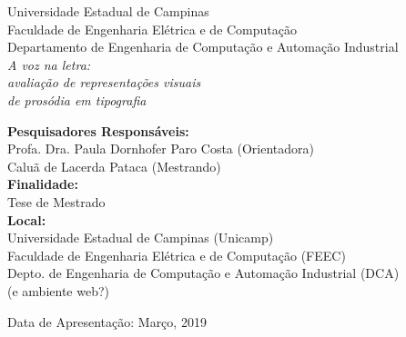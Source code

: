 \documentclass[a4paper,11pt,titlepage,singlespacing]{article}
\begin{document}
\begin{titlepage}
	\begin{center}
		\large{Universidade Estadual de Campinas}\\
		\large{Faculdade de Engenharia Elétrica e de Computação}\\ 
		\large{Departamento de Engenharia de Computação e Automação Industrial}\\ 
        \vspace{115pt}
        \huge\textit{A voz na letra: \\ avaliação de representações visuais \\ de prosódia em tipografia}\\
        
	\end{center}
	\vspace{95pt}
	\begin{flushleft}
        \large{\textbf{Pesquisadores Responsáveis:}}\\
        Profa. Dra. Paula Dornhofer Paro Costa (Orientadora)\\	
        Caluã de Lacerda Pataca (Mestrando)\\
        
        
        \vspace{15pt}
        \large{\textbf{Finalidade:} \\Tese de Mestrado}\\
        \vspace{15pt}
        \large{\textbf{Local:} \\
        Universidade Estadual de Campinas (Unicamp)
        \\Faculdade de Engenharia Elétrica e de Computação (FEEC)}\\
        Depto. de Engenharia de Computação e Automação Industrial (DCA)\\
        (e ambiente web?)
        \vspace{15pt}        
	\end{flushleft}
	\vspace{3,5cm}
	\begin{center}
	 Data de Apresentação: Março, 2019
	\end{center}


\end{titlepage}
\end{document}
